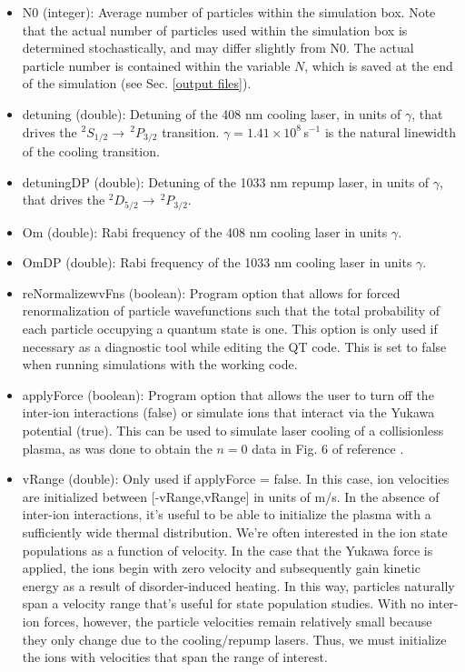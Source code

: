 \documentclass{article}
\begin{document}
\begin{itemize}
		\item N0 (integer): Average number of particles within the simulation box. Note that the actual number of particles used within the simulation box is determined stochastically, and may differ slightly from N0. The actual particle number is contained within the variable $N$, which is saved at the end of the simulation (see Sec. \ref{output files}).
		
		\item detuning (double): Detuning of the 408 nm cooling laser, in units of $\gamma$, that drives the $^2S_{1/2}\rightarrow\,^2P_{3/2}$ transition. $\gamma =1.41\times 10^{8}$\,s$^{-1}$ is the natural linewidth of the cooling transition.
		
		\item detuningDP (double): Detuning of the 1033 nm repump laser, in units of $\gamma$, that drives the $^2D_{5/2}\rightarrow\,^2P_{3/2}$.
		
		\item Om (double): Rabi frequency of the 408 nm cooling laser in units $\gamma$.
		
		\item OmDP (double): Rabi frequency of the 1033 nm cooling laser in units $\gamma$.
		
		\item reNormalizewvFns (boolean): Program option that allows for forced renormalization of particle wavefunctions such that the total probability of each particle occupying a quantum state is one. This option is only used if necessary as a diagnostic tool while editing the QT code. This is set to false when running simulations with the working code.
		
		\item applyForce (boolean): Program option that allows the user to turn off the inter-ion interactions (false) or simulate ions that interact via the Yukawa potential (true). This can be used to simulate laser cooling of a collisionless plasma, as was done to obtain the $n=0$ data in Fig. 6 of reference \cite{glk2019}. 
				
		\item vRange (double): Only used if applyForce = false. In this case, ion velocities are initialized between [-vRange,vRange] in units of m/s. In the absence of inter-ion interactions, it's useful to be able to initialize the plasma with a sufficiently wide thermal distribution. We're often interested in the ion state populations as a function of velocity. In the case that the Yukawa force is applied, the ions begin with zero velocity and subsequently gain kinetic energy as a result of disorder-induced heating. In this way, particles naturally span a velocity range that's useful for state population studies. With no inter-ion forces, however, the particle velocities remain relatively small because they only change due to the cooling/repump lasers. Thus, we must initialize the ions with velocities that span the range of interest.
		

\end{itemize}
\end{document}
